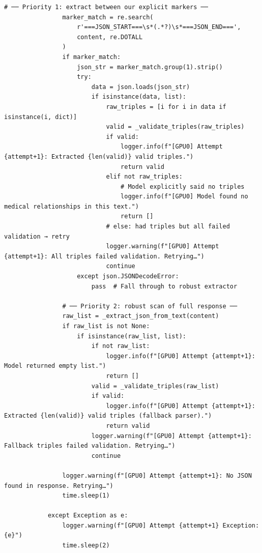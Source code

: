 \documentclass[11pt]{article}
\begin{document}
\begin{lstlisting}[style=pythoncode, caption={kg\_generator\_gpu\_0.py}]
                # ── Priority 1: extract between our explicit markers ──
                marker_match = re.search(
                    r'===JSON_START===\s*(.*?)\s*===JSON_END===',
                    content, re.DOTALL
                )
                if marker_match:
                    json_str = marker_match.group(1).strip()
                    try:
                        data = json.loads(json_str)
                        if isinstance(data, list):
                            raw_triples = [i for i in data if isinstance(i, dict)]
                            valid = _validate_triples(raw_triples)
                            if valid:
                                logger.info(f"[GPU0] Attempt {attempt+1}: Extracted {len(valid)} valid triples.")
                                return valid
                            elif not raw_triples:
                                # Model explicitly said no triples
                                logger.info(f"[GPU0] Model found no medical relationships in this text.")
                                return []
                            # else: had triples but all failed validation → retry
                            logger.warning(f"[GPU0] Attempt {attempt+1}: All triples failed validation. Retrying…")
                            continue
                    except json.JSONDecodeError:
                        pass  # Fall through to robust extractor

                # ── Priority 2: robust scan of full response ──
                raw_list = _extract_json_from_text(content)
                if raw_list is not None:
                    if isinstance(raw_list, list):
                        if not raw_list:
                            logger.info(f"[GPU0] Attempt {attempt+1}: Model returned empty list.")
                            return []
                        valid = _validate_triples(raw_list)
                        if valid:
                            logger.info(f"[GPU0] Attempt {attempt+1}: Extracted {len(valid)} valid triples (fallback parser).")
                            return valid
                        logger.warning(f"[GPU0] Attempt {attempt+1}: Fallback triples failed validation. Retrying…")
                        continue

                logger.warning(f"[GPU0] Attempt {attempt+1}: No JSON found in response. Retrying…")
                time.sleep(1)

            except Exception as e:
                logger.warning(f"[GPU0] Attempt {attempt+1} Exception: {e}")
                time.sleep(2)


\end{lstlisting}
\end{document}
